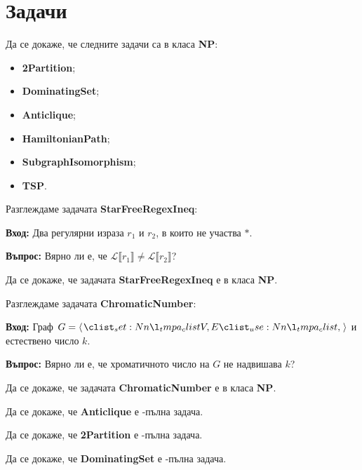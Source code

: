 \section{Задачи}

\begin{problem}
Да се докаже, че следните задачи са в класа \textbf{NP}:
\begin{itemize}
    \item \textbf{2Partition};
    \item \textbf{DominatingSet};
    \item \textbf{Anticlique};
    \item \textbf{HamiltonianPath};
    \item \textbf{SubgraphIsomorphism};
    \item \textbf{TSP}.
\end{itemize}
\end{problem}

\begin{problem}
Разглеждаме задачата \textbf{StarFreeRegexIneq}:

\vspace*{2mm}
\textbf{Вход:} Два регулярни израза $r_1$ и $r_2$, в които не участва $*$.

\textbf{Въпрос:} Вярно ли е, че $\mathcal{L}\llbracket r_1 \rrbracket \neq \mathcal{L}\llbracket r_2 \rrbracket$?
\vspace*{2mm}

Да се докаже, че задачата \textbf{StarFreeRegexIneq} е в класа \textbf{NP}.
\end{problem}

\begin{problem}
Разглеждаме задачата \textbf{ChromaticNumber}:

\vspace*{2mm}
\textbf{Вход:} Граф $G = \opair{V, E}$ и естествено число $k$.

\textbf{Въпрос:} Вярно ли е, че хроматичното число на $G$ не надвишава $k$?
\vspace*{2mm}

Да се докаже, че задачата \textbf{ChromaticNumber} е в класа \textbf{NP}.
\end{problem}

\begin{problem}
Да се докаже, че \textbf{Anticlique} е \NP-пълна задача.
\end{problem}

\begin{problem}
Да се докаже, че \textbf{2Partition} е \NP-пълна задача.
\end{problem}

\begin{problem}
Да се докаже, че \textbf{DominatingSet} е \NP-пълна задача.
\end{problem}